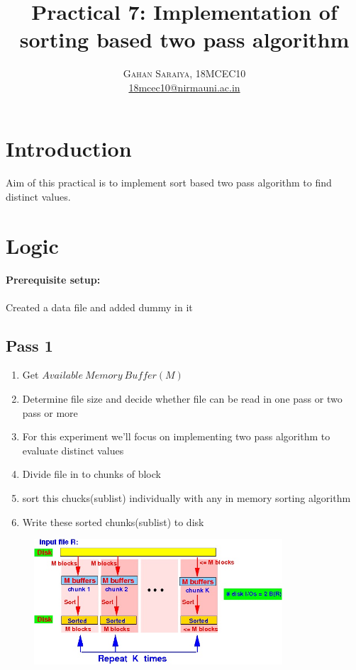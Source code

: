 \documentclass[paper=letter, fontsize=12pt]{article}
\title{\vspace{-15mm}\fontsize{24pt}{10pt}\selectfont\textbf{Practical 7: Implementation of sorting based two pass algorithm}} %
\author{
\large
{\textsc{Gahan Saraiya, 18MCEC10 }}\\[2mm]
\normalsize \href{mailto:18mcec10@nirmauni.ac.in}{18mcec10@nirmauni.ac.in}\\[2mm] %
}
\date{}
\begin{document}
\maketitle %
\thispagestyle{fancy} %


\section{Introduction}
\paragraph{} Aim of this practical is to implement sort based two pass algorithm to find distinct values.

\section{Logic}
\paragraph{Prerequisite setup:} Created a data file and added dummy in it
\subsection{Pass 1}
	\begin{enumerate}
		\item Get $Available\ Memory\ Buffer(M)$
		\item Determine file size and decide whether file can be read in one pass or two pass or more
		\item For this experiment we'll focus on implementing two pass algorithm to evaluate distinct values
		\item Divide file in to chunks of block
		\item sort this chucks(sublist) individually with any in memory sorting algorithm
		\item Write these sorted chunks(sublist) to disk
	\end{enumerate}

	\begin{figure}[H]
		\centering
		\includegraphics[width=350px]{assets/pass1.jpg}
	\end{figure}
\end{document}

